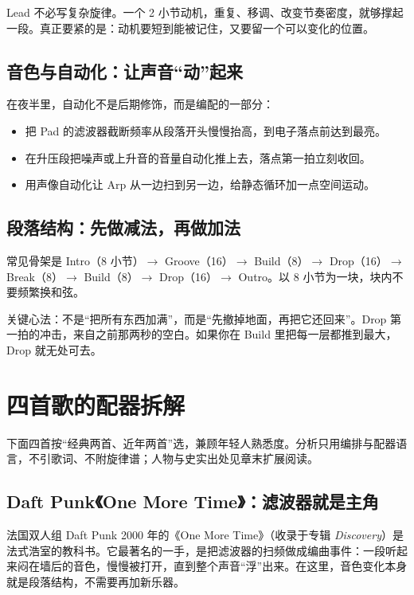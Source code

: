 Lead 不必写复杂旋律。一个 2 小节动机，重复、移调、改变节奏密度，就够撑起一段。真正要紧的是：动机要短到能被记住，又要留一个可以变化的位置。

\subsection{音色与自动化：让声音“动”起来}
\label{sec:edm-automation}

在夜半里，自动化不是后期修饰，而是编配的一部分：

\begin{itemize}
\item 把 Pad 的滤波器截断频率从段落开头慢慢抬高，到电子落点前达到最亮。
\item 在升压段把噪声或上升音的音量自动化推上去，落点第一拍立刻收回。
\item 用声像自动化让 Arp 从一边扫到另一边，给静态循环加一点空间运动。
\end{itemize}

\subsection{段落结构：先做减法，再做加法}
\label{sec:edm-structure}

常见骨架是 Intro（8 小节）$\to$ Groove（16）$\to$ Build（8）$\to$ Drop（16）$\to$ Break（8）$\to$ Build（8）$\to$ Drop（16）$\to$ Outro。以 8 小节为一块，块内不要频繁换和弦。

关键心法：不是“把所有东西加满”，而是“先撤掉地面，再把它还回来”。Drop 第一拍的冲击，来自之前那两秒的空白。如果你在 Build 里把每一层都推到最大，Drop 就无处可去。

\section{四首歌的配器拆解}
\label{sec:edm-cases}

下面四首按“经典两首、近年两首”选，兼顾年轻人熟悉度。分析只用编排与配器语言，不引歌词、不附旋律谱；人物与史实出处见章末扩展阅读。

\subsection{Daft Punk《One More Time》：滤波器就是主角}
\label{sec:edm-case-daft}

法国双人组 Daft Punk 2000 年的《One More Time》（收录于专辑 \emph{Discovery}）是法式浩室的教科书。它最著名的一手，是把滤波器的扫频做成编曲事件：一段听起来闷在墙后的音色，慢慢被打开，直到整个声音“浮”出来。在这里，音色变化本身就是段落结构，不需要再加新乐器。

